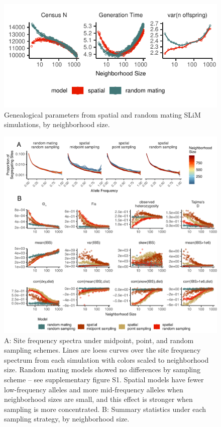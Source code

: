 \documentclass[10pt,twoside,lineno]{gsajnl}
\begin{document}
\begin{figure}[htbp]
\includegraphics{figures/pop_params.pdf}
\caption{Genealogical parameters from spatial and random mating SLiM simulations, by neighborhood size.}
\label{fig:genparams}
\end{figure}


\begin{figure}[p]
\centering
\includegraphics[width=\textwidth]{figures/sfs_w_sumstats.pdf}
\caption{A: Site frequency spectra under midpoint, point, and random sampling schemes. Lines are loess curves over the site frequency spectrum from each simulation with colors scaled to neighborhood size. Random mating models showed no differences by sampling scheme -- see supplementary figure S1. Spatial models have fewer low-frequency alleles and more mid-frequency alleles when neighborhood sizes are small, and this effect is stronger when sampling is more concentrated. B: Summary statistics under each sampling strategy, by neighborhood size.}
\label{fig:sumstats}
\end{figure}
\end{document}
